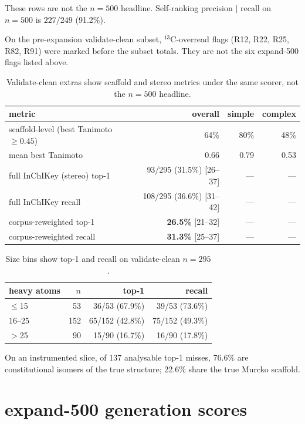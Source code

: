 \documentclass[11pt]{article}
\begin{document}
These rows are not the $n{=}500$ headline.
Self-ranking precision $|$ recall on $n{=}500$ is $227/249$ (91.2\%).

On the pre-expansion validate-clean subset, $^{13}$C-overread flags
(R12, R22, R25, R82, R91) were marked before the subset totals.
They are not the six expand-500 flags listed above.

\begin{table}[h]
\caption{Validate-clean extras show scaffold and stereo metrics under
the same scorer, not the $n{=}500$ headline.}
\centering
\small
\begin{tabular}{@{}lrrr@{}}
\toprule
metric & overall & simple & complex \\
\midrule
scaffold-level (best Tanimoto $\geq 0.45$) & 64\% & 80\% & 48\% \\
mean best Tanimoto & 0.66 & 0.79 & 0.53 \\
full InChIKey (stereo) top-1 & 93/295 (31.5\%) [26--37] & --- & --- \\
full InChIKey recall & 108/295 (36.6\%) [31--42] & --- & --- \\
corpus-reweighted top-1 & \textbf{26.5\%} [21--32] & --- & --- \\
corpus-reweighted recall & \textbf{31.3\%} [25--37] & --- & --- \\
\bottomrule
\end{tabular}
\end{table}

\begin{table}[h]
\caption{Size bins show top-1 and recall on validate-clean $n{=}295$.}
\centering
\begin{tabular}{@{}lrrr@{}}
\toprule
heavy atoms & $n$ & top-1 & recall \\
\midrule
$\leq$15 & 53 & 36/53 (67.9\%) & 39/53 (73.6\%) \\
16--25 & 152 & 65/152 (42.8\%) & 75/152 (49.3\%) \\
$>$25 & 90 & 15/90 (16.7\%) & 16/90 (17.8\%) \\
\bottomrule
\end{tabular}
\end{table}

On an instrumented slice, of 137 analysable top-1 misses, 76.6\% are
constitutional isomers of the true structure; 22.6\% share
the true Murcko scaffold.
\section{expand-500 generation scores}
\label{si:e500}
\end{document}
